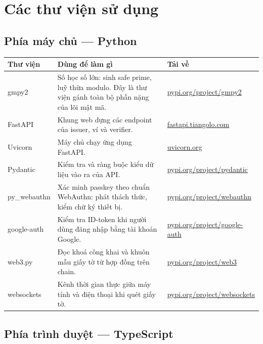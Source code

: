 \documentclass[a4paper,11pt]{article}
\begin{document}
\section{Các thư viện sử dụng}

\subsection*{Phía máy chủ --- Python}

\begin{longtable}{@{}p{2.9cm}p{6.6cm}p{4.4cm}@{}}
\toprule
\textbf{\sffamily Thư viện} & \textbf{\sffamily Dùng để làm gì} & \textbf{\sffamily Tải về} \\
\midrule
\endhead
gmpy2 & Số học số lớn: sinh safe prime, luỹ thừa modulo. Đây là thư viện gánh toàn bộ phần nặng của lõi mật mã. & \href{https://pypi.org/project/gmpy2/}{pypi.org/project/gmpy2} \\
\addlinespace
FastAPI & Khung web dựng các endpoint của issuer, ví và verifier. & \href{https://fastapi.tiangolo.com/}{fastapi.tiangolo.com} \\
\addlinespace
Uvicorn & Máy chủ chạy ứng dụng FastAPI. & \href{https://www.uvicorn.org/}{uvicorn.org} \\
\addlinespace
Pydantic & Kiểm tra và ràng buộc kiểu dữ liệu vào ra của API. & \href{https://pypi.org/project/pydantic/}{pypi.org/project/pydantic} \\
\addlinespace
py\_webauthn & Xác minh passkey theo chuẩn WebAuthn: phát thách thức, kiểm chữ ký thiết bị. & \href{https://pypi.org/project/webauthn/}{pypi.org/project/webauthn} \\
\addlinespace
google-auth & Kiểm tra ID-token khi người dùng đăng nhập bằng tài khoản Google. & \href{https://pypi.org/project/google-auth/}{pypi.org/project/google-auth} \\
\addlinespace
web3.py & Đọc khoá công khai và khuôn mẫu giấy tờ từ hợp đồng trên chain. & \href{https://pypi.org/project/web3/}{pypi.org/project/web3} \\
\addlinespace
websockets & Kênh thời gian thực giữa máy tính và điện thoại khi quét giấy tờ. & \href{https://pypi.org/project/websockets/}{pypi.org/project/websockets} \\
\bottomrule
\end{longtable}

\subsection*{Phía trình duyệt --- TypeScript}
\end{document}
